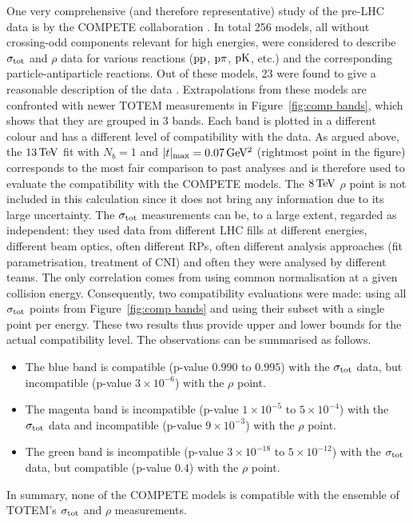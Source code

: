 One very comprehensive (and therefore representative) study of the pre-LHC data is by the COMPETE collaboration \cite{compete}. In total 256 models, all without crossing-odd components relevant for high energies, were considered to describe $\sigma_{\rm tot}$ and $\rho$ data for various reactions ($\rm pp$, $\rm p\pi$, $\rm pK$, etc.) and the corresponding particle-antiparticle reactions. Out of these models, 23 were found to give a reasonable description of the data \cite{compete-details}. Extrapolations from these models are confronted with newer TOTEM measurements in Figure~\ref{fig:comp bands}, which shows that they are grouped in 3 bands. Each band is plotted in a different colour and has a different level of compatibility with the data. As argued above, the $13\,{\rm TeV}$ fit with $N_b=1$ and $|t|_{\rm max} = 0.07\,{\rm GeV^2}$ (rightmost point in the figure) corresponds to the most fair comparison to past analyses and is therefore used to evaluate the compatibility with the COMPETE models. The $8\,{\rm TeV}$ $\rho$ point is not included in this calculation since it does not bring any information due to its large uncertainty. The $\sigma_{\rm tot}$ measurements can be, to a large extent, regarded as independent: they used data from different LHC fills at different energies, different beam optics, often different RPs, often different analysis approaches (fit parametrisation, treatment of CNI) and often they were analysed by different teams. The only correlation comes from using common normalisation at a given collision energy. Consequently, two compatibility evaluations were made: using all $\sigma_{\rm tot}$ points from Figure~\ref{fig:comp bands} and using their subset with a single point per energy. These two results thus provide upper and lower bounds for the actual compatibility level. The observations can be summarised as follows.
\begin{itemize}[noitemsep,topsep=0pt]
\item The blue band is compatible (p-value $0.990$ to $0.995$) with the $\sigma_{\rm tot}$ data, but incompatible (p-value $3\times10^{-6}$) with the $\rho$ point.
\item The magenta band is incompatible (p-value $1\times10^{-5}$ to $5\times10^{-4}$) with the $\sigma_{\rm tot}$ data and incompatible (p-value $9\times10^{-3}$) with the $\rho$ point.
\item The green band is incompatible (p-value $3\times10^{-18}$ to $5\times10^{-12}$) with the $\sigma_{\rm tot}$ data, but compatible (p-value $0.4$) with the $\rho$ point.
\end{itemize}
In summary, none of the COMPETE models is compatible with the ensemble of TOTEM's $\sigma_{\rm tot}$ and $\rho$ measurements.

